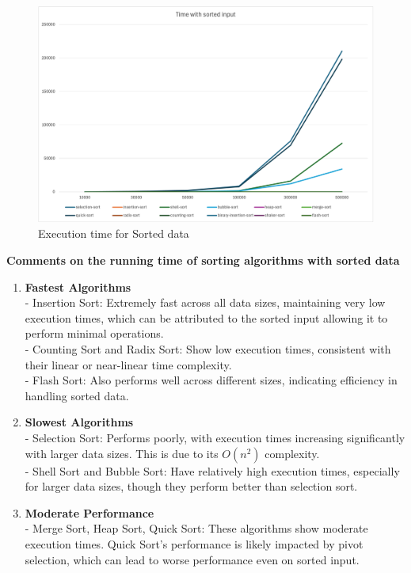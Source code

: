 \begin{figure}[h]
    \centering
    \includegraphics[scale=.65]{Figures/Visualization/Sorted_time.png}
    \caption{Execution time for Sorted data}
    \label{fig:enter-label}
\end{figure}

\textbf{Comments on the running time of sorting algorithms with sorted data}
\begin{enumerate}
    \item \textbf{Fastest Algorithms} \\
   - Insertion Sort: Extremely fast across all data sizes, maintaining very low execution times, which can be attributed to the sorted input allowing it to perform minimal operations. \\
   - Counting Sort and Radix Sort: Show low execution times, consistent with their linear or near-linear time complexity. \\
   - Flash Sort: Also performs well across different sizes, indicating efficiency in handling sorted data.

    \item \textbf{Slowest Algorithms} \\
   - Selection Sort: Performs poorly, with execution times increasing significantly with larger data sizes. This is due to its \(O(n^2)\) complexity. \\
   - Shell Sort and Bubble Sort: Have relatively high execution times, especially for larger data sizes, though they perform better than selection sort.

    \item \textbf{Moderate Performance} \\
   - Merge Sort, Heap Sort, Quick Sort: These algorithms show moderate execution times. Quick Sort's performance is likely impacted by pivot selection, which can lead to worse performance even on sorted input.
\end{enumerate}

